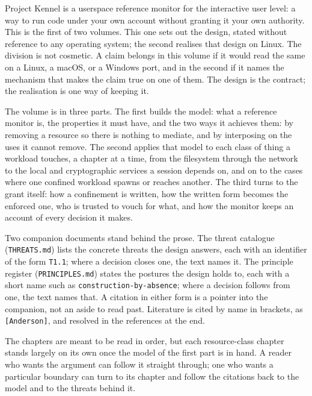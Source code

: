 Project Kennel is a userspace reference monitor for the interactive user
level: a way to run code under your own account without granting it your
own authority. This is the first of two volumes. This one sets out the
design, stated without reference to any operating system; the second
realises that design on Linux. The division is not cosmetic. A claim
belongs in this volume if it would read the same on a Linux, a macOS, or
a Windows port, and in the second if it names the mechanism that makes
the claim true on one of them. The design is the contract; the
realisation is one way of keeping it.

The volume is in three parts. The first builds the model: what a
reference monitor is, the properties it must have, and the two ways it
achieves them: by removing a resource so there is nothing to mediate,
and by interposing on the uses it cannot remove. The second applies that
model to each class of thing a workload touches, a chapter at a time,
from the filesystem through the network to the local and cryptographic
services a session depends on, and on to the cases where one confined
workload spawns or reaches another. The third turns to the grant itself:
how a confinement is written, how the written form becomes the enforced
one, who is trusted to vouch for what, and how the monitor keeps an
account of every decision it makes.

Two companion documents stand behind the prose. The threat catalogue
(\texttt{THREATS.md}) lists the concrete threats the design answers,
each with an identifier of the form \texttt{T1.1}; where a decision
closes one, the text names it. The principle register
(\texttt{PRINCIPLES.md}) states the postures the design holds to, each
with a short name such as \texttt{construction-by-absence}; where a
decision follows from one, the text names that. A citation in either
form is a pointer into the companion, not an aside to read past.
Literature is cited by name in brackets, as \texttt{{[}Anderson{]}}, and
resolved in the references at the end.

The chapters are meant to be read in order, but each resource-class
chapter stands largely on its own once the model of the first part is in
hand. A reader who wants the argument can follow it straight through;
one who wants a particular boundary can turn to its chapter and follow
the citations back to the model and to the threats behind it.
